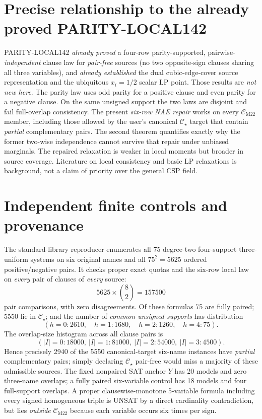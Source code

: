 \documentclass[11pt]{article}
\newcommand{\CM}{\mathcal C_{\mathrm{M22}}}
\newcommand{\CS}{\mathcal C_\star}
\begin{document}
\section{Precise relationship to the already proved PARITY-LOCAL142}
PARITY-LOCAL142 \emph{already proved} a four-row parity-supported, pairwise-\emph{independent} clause law for \emph{pair-free} sources (no two opposite-sign clauses sharing all three variables), and \emph{already established} the dual cubic-edge-cover source representation and the ubiquitous $x_i=1/2$ scalar LP point. Those results are \emph{not new here}. The parity law uses odd parity for a positive clause and even parity for a negative clause. On the same unsigned support the two laws are disjoint and fail full-overlap consistency. The present \emph{six-row NAE repair} works on every $\CM$ member, including those allowed by the user's canonical $\CS$ target that contain \emph{partial} complementary pairs. The second theorem quantifies exactly why the former two-wise independence cannot survive that repair under unbiased marginals. The repaired relaxation is weaker in local moments but broader in source coverage. Literature on local consistency and basic LP relaxations is background, not a claim of priority over the general CSP field.

\section{Independent finite controls and provenance}
The standard-library reproducer  enumerates all 75 degree-two four-support three-uniform systems on six original names and all $75^2=5625$ ordered positive/negative pairs. It checks proper exact quotas and the six-row local law on \emph{every} pair of clauses of \emph{every} source:
\[
 5625\times {8\choose2}=157500
\]
pair comparisons, with zero disagreements. Of these formulas 75 are fully paired; 5550 lie in $\CS$; and the number of \emph{common unsigned supports} has distribution
\[
 (h=0:2610,\quad h=1:1680,\quad h=2:1260,\quad h=4:75).
\]
The overlap-size histogram across all clause pairs is
\[
 (|I|=0:18000,\ |I|=1:81000,\ |I|=2:54000,\ |I|=3:4500).
\]
Hence precisely 2940 of the 5550 canonical-target six-name instances have \emph{partial} complementary pairs; simply declaring $\CS$ pair-free would miss a majority of these admissible sources. The fixed nonpaired SAT anchor $Y$ has 20 models and zero three-name overlaps; a fully paired six-variable control has 18 models and four full-support overlaps. A proper clausewise-monotone 5-variable formula including every signed homogeneous triple is UNSAT by a direct cardinality contradiction, but lies \emph{outside} $\CM$ because each variable occurs six times per sign.
\end{document}
